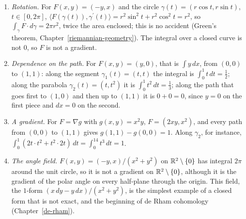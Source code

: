 \begin{example}\label{real-analysis:example-second-kind}
\begin{enumerate}
\item \emph{Rotation.} For $F(x, y) = (-y, x)$ and the circle $\gamma(t) = (r\cos t, r\sin t)$, $t \in [0, 2\pi]$, $\langle F(\gamma(t)), \gamma^{\prime}(t)\rangle = r^2\sin^2t + r^2\cos^2t = r^2$, so
$\int_\gamma F \cdot d\gamma = 2\pi r^2$, twice the area enclosed; this is no accident (Green's theorem, Chapter~\ref{riemannian-geometry}). The integral over a closed curve is not $0$, so $F$ is not a gradient.
\item \emph{Dependence on the path.} For $F(x, y) = (y, 0)$, that is $\int y\,dx$, from $(0, 0)$ to $(1, 1)$: along the segment $\gamma_1(t) = (t, t)$ the integral is $\int_0^1t\,dt = \frac12$; along the
parabola $\gamma_2(t) = (t, t^2)$ it is $\int_0^1t^2\,dt = \frac13$; along the path that goes first to $(1, 0)$ and then up to $(1, 1)$ it is $0 + 0 = 0$, since $y = 0$ on the first piece and $dx = 0$ on
the second.
\item \emph{A gradient.} For $F = \nabla g$ with $g(x, y) = x^2y$, $F = (2xy, x^2)$, and every path from $(0, 0)$ to $(1, 1)$ gives $g(1, 1) - g(0, 0) = 1$. Along $\gamma_2$, for instance,
$\int_0^1(2t \cdot t^2 + t^2 \cdot 2t)\,dt = \int_0^14t^3\,dt = 1$.
\item \emph{The angle field.} $F(x, y) = (-y, x)/(x^2 + y^2)$ on $\mathbb{R}^2 \setminus \{0\}$ has integral $2\pi$ around the unit circle, so it is not a gradient on $\mathbb{R}^2 \setminus \{0\}$, although it is the gradient of
the polar angle on every half-plane through the origin. This field, the $1$-form $(x\,dy - y\,dx)/(x^2 + y^2)$, is the simplest example of a closed form that is not exact, and the beginning of de Rham cohomology
(Chapter~\ref{de-rham}).
\end{enumerate}
\end{example}

